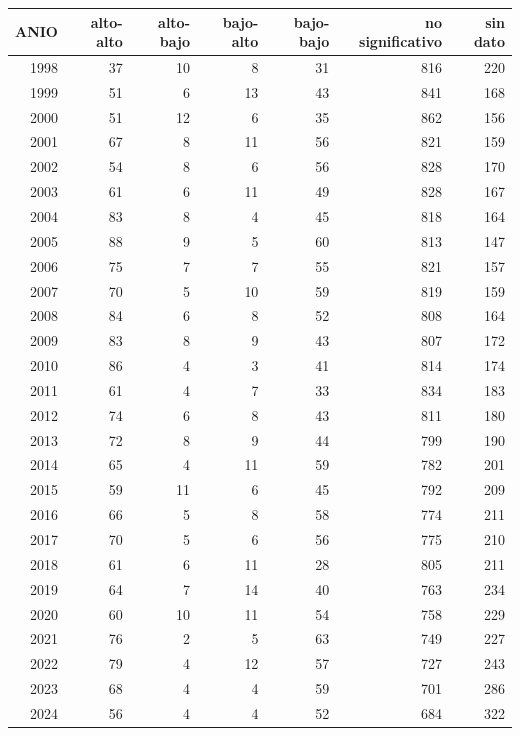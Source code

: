 \begin{tabular}{rrrrrrr}
\toprule
ANIO & alto-alto & alto-bajo & bajo-alto & bajo-bajo & no significativo & sin dato \\
\midrule
1998 & 37 & 10 & 8 & 31 & 816 & 220 \\
1999 & 51 & 6 & 13 & 43 & 841 & 168 \\
2000 & 51 & 12 & 6 & 35 & 862 & 156 \\
2001 & 67 & 8 & 11 & 56 & 821 & 159 \\
2002 & 54 & 8 & 6 & 56 & 828 & 170 \\
2003 & 61 & 6 & 11 & 49 & 828 & 167 \\
2004 & 83 & 8 & 4 & 45 & 818 & 164 \\
2005 & 88 & 9 & 5 & 60 & 813 & 147 \\
2006 & 75 & 7 & 7 & 55 & 821 & 157 \\
2007 & 70 & 5 & 10 & 59 & 819 & 159 \\
2008 & 84 & 6 & 8 & 52 & 808 & 164 \\
2009 & 83 & 8 & 9 & 43 & 807 & 172 \\
2010 & 86 & 4 & 3 & 41 & 814 & 174 \\
2011 & 61 & 4 & 7 & 33 & 834 & 183 \\
2012 & 74 & 6 & 8 & 43 & 811 & 180 \\
2013 & 72 & 8 & 9 & 44 & 799 & 190 \\
2014 & 65 & 4 & 11 & 59 & 782 & 201 \\
2015 & 59 & 11 & 6 & 45 & 792 & 209 \\
2016 & 66 & 5 & 8 & 58 & 774 & 211 \\
2017 & 70 & 5 & 6 & 56 & 775 & 210 \\
2018 & 61 & 6 & 11 & 28 & 805 & 211 \\
2019 & 64 & 7 & 14 & 40 & 763 & 234 \\
2020 & 60 & 10 & 11 & 54 & 758 & 229 \\
2021 & 76 & 2 & 5 & 63 & 749 & 227 \\
2022 & 79 & 4 & 12 & 57 & 727 & 243 \\
2023 & 68 & 4 & 4 & 59 & 701 & 286 \\
2024 & 56 & 4 & 4 & 52 & 684 & 322 \\
\bottomrule
\end{tabular}
